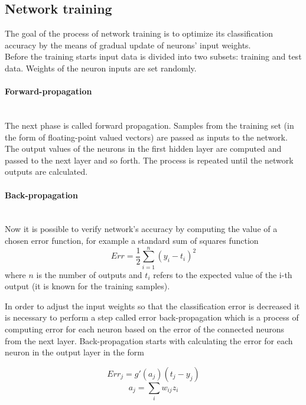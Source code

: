 \documentclass[11pt,oneside, a4paper]{report}
\begin{document}
\subsection{Network training}\label{ssec:network-training}
The goal of the process of network training is to optimize its classification accuracy by the means of gradual update of neurons' input weights.
\\
Before the training starts input data is divided into two subsets: training and test data. Weights of the neuron inputs are set randomly.
\\
\paragraph{Forward-propagation}\mbox{}\\
The next phase is called forward propagation. Samples from the training set (in the form of floating-point valued vectors) are passed as inputs to the network. The output values of the neurons in the first hidden layer are computed and passed to the next layer and so forth. The process is repeated until the network outputs are calculated.

\paragraph{Back-propagation}\mbox{}\\
Now it is possible to verify network's accuracy by computing the value of a chosen error function, for example a standard sum of squares function
\begin{equation}
Err = \frac{1}{2}\sum_{i=1}^{n}(y_i - t_i)^2
\end{equation}
where $n$ is the number of outputs and $t_i$ refers to the expected value of the i-th output (it is known for the training samples).

In order to adjust the input weights so that the classification error is decreased it is necessary to perform a step called error back-propagation which is a process of computing error for each neuron based on the error of the connected neurons from the next layer. Back-propagation starts with calculating the error for each neuron in the output layer in the form

\begin{equation}
Err_j = g'(a_j) (t_j - y_j)
\end{equation}
\begin{equation}
a_j=\sum_{i} w_{ij} z_i
\end{equation}
\end{document}
